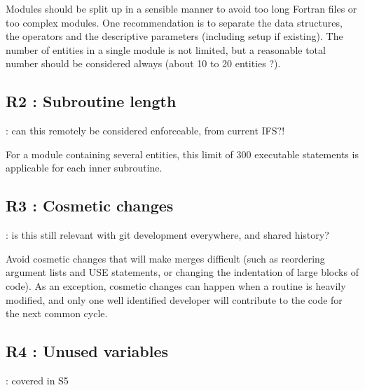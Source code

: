 \documentclass[letterpaper,10pt,english]{sphinxmanual}
\begin{document}
\sphinxAtStartPar
Modules should be split up in a sensible manner to avoid too long Fortran files or too complex modules.
One recommendation is to separate the data structures, the operators and the descriptive parameters
(including setup if existing).
The number of entities in a single module is not limited, but a reasonable total number should be
considered always (about 10 to 20 entities ?).

\sphinxstepscope


\subsection{R2 : Subroutine length}
\label{\detokenize{obsolescent/r2:r2-subroutine-length}}\label{\detokenize{obsolescent/r2::doc}}
\sphinxAtStartPar
{} : can this remotely be considered enforceable, from current IFS?!
\begin{description}
\sphinxAtStartPar
For a module containing several entities, this limit of 300 executable statements is applicable for each inner subroutine.

\end{description}

\sphinxstepscope


\subsection{R3 : Cosmetic changes}
\label{\detokenize{obsolescent/r3:r3-cosmetic-changes}}\label{\detokenize{obsolescent/r3::doc}}
\sphinxAtStartPar
{} : is this still relevant with git development everywhere, and shared history?

\sphinxAtStartPar
Avoid cosmetic changes that will make merges difficult (such as re\sphinxhyphen{}ordering argument lists and
USE statements, or changing the indentation of large blocks of code).
As an exception, cosmetic changes can happen when a routine is heavily modified, and only one
well identified developer will contribute to the code for the next common cycle.

\sphinxstepscope


\subsection{R4 :  Unused variables}
\label{\detokenize{obsolescent/r4:r4-unused-variables}}\label{\detokenize{obsolescent/r4::doc}}
\sphinxAtStartPar
{} : covered in S5
\end{document}
